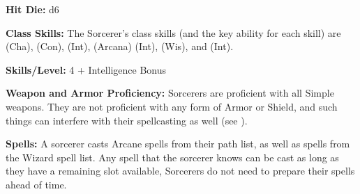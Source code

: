 \textbf{Hit Die:} d6

\textbf{Class Skills:} The Sorcerer's class skills (and the key ability for each skill) are  (Cha),  (Con),  (Int),  (Arcana) (Int),  (Wis), and  (Int).

\textbf{Skills/Level:} 4 + Intelligence Bonus

\poorbab{}
\poorfor{}
\poorref{}
\goodwil{}

\begin{fullcastingclasstable}
\end{fullcastingclasstable}

\classfeatures

\textbf{Weapon and Armor Proficiency:} Sorcerers are proficient with all Simple weapons. They are not proficient with any form of Armor or Shield, and such things can interfere with their spellcasting as well (see ).

\textbf{Spells:} A sorcerer casts Arcane spells from their path list, as well as spells from the Wizard spell list. Any spell that the sorcerer knows can be cast as long as they have a remaining slot available, Sorcerers do not need to prepare their spells ahead of time.

